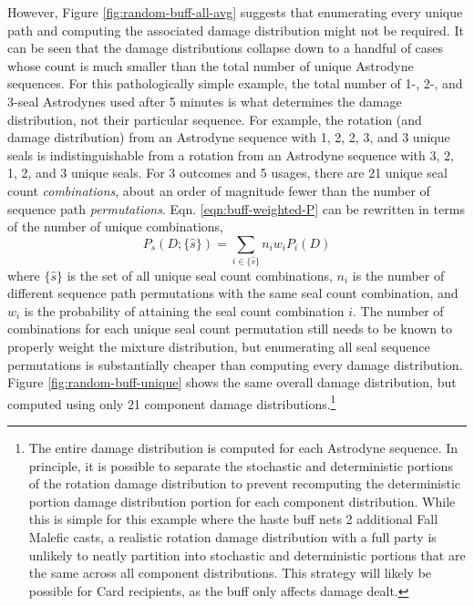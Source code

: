 \documentclass{article}
\begin{document}
    However, Figure \ref{fig:random-buff-all-avg} suggests that enumerating every unique path and computing the associated damage distribution might not be required. It can be seen that the damage distributions collapse down to a handful of cases whose count is much smaller than the total number of unique Astrodyne sequences. For this pathologically simple example, the total number of 1-, 2-, and 3-seal Astrodynes used after 5 minutes is what determines the damage distribution, not their particular sequence. For example, the rotation (and damage distribution) from an Astrodyne sequence with 1, 2, 2, 3, and 3 unique seals is indistinguishable from a rotation from an Astrodyne sequence with 3, 2, 1, 2, and 3 unique seals. 
    For 3 outcomes and 5 usages, there are 21 unique seal count \textit{combinations}, about an order of magnitude fewer than the number of sequence path \textit{permutations}. Eqn. \ref{eqn:buff-weighted-P} can be rewritten in terms of the number of unique combinations,
    \begin{equation}
        P_s(D; \{\hat{s}\}) = \sum_{i \in \{\hat{s}\}} n_i w_i P_i(D)
    \end{equation}
    where $\{\hat{s}\}$ is the set of all unique seal count combinations, $n_i$ is the number of different sequence path permutations with the same seal count combination, and $w_i$ is the probability of attaining the seal count combination $i$. The number of combinations for each unique seal count permutation still needs to be known to properly weight the mixture distribution, but enumerating all seal sequence permutations is substantially cheaper than computing every damage distribution. Figure \ref{fig:random-buff-unique} shows the same overall damage distribution, but computed using only 21 component damage distributions.\footnote{The entire damage distribution is computed for each Astrodyne sequence. In principle, it is possible to separate the stochastic and deterministic portions of the rotation damage distribution to prevent recomputing the deterministic portion damage distribution portion for each component distribution. While this is simple for this example where the haste buff nets 2 additional Fall Malefic casts, a realistic rotation damage distribution with a full party is unlikely to neatly partition into stochastic and deterministic portions that are the same across all component distributions. This strategy will likely be possible for Card recipients, as the buff only affects damage dealt.}
\end{document}
